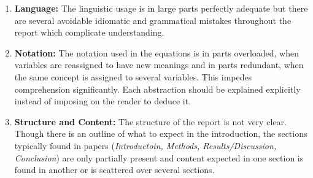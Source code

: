 \documentclass[../review.tex]{subfiles}
\begin{document}
 \textcolor{green}{\Large\checkmark}
\begin{enumerate}
 \item \textbf{Language:} The linguistic usage is in large parts perfectly adequate but there are several avoidable idiomatic and grammatical mistakes throughout the report which complicate understanding.
 \item \textbf{Notation:} The notation used in the equations is in parts overloaded, when variables are reassigned to have new meanings and in parts redundant, when the same concept is assigned to several variables. This impedes comprehension significantly. Each abstraction should be explained explicitly instead of imposing on the reader to deduce it.
 \item \textbf{Structure and Content:} The structure of the report is not very clear. Though there is an outline of what to expect in the introduction, the sections typically found in papers (\textit{Introductoin, Methods, Results/Discussion, Conclusion}) are only partially present and content expected in one section is found in another or is scattered over several sections.
\end{enumerate}
\end{document}
